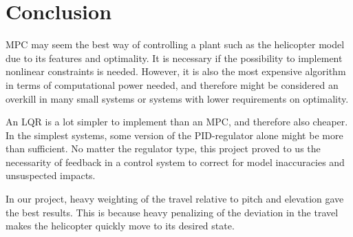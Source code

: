 \section{Conclusion}\label{sec:conclusion}
MPC may seem the best way of controlling a plant such as the helicopter model due to its features and optimality. It is necessary if the possibility to implement nonlinear constraints is needed. However, it is also the most expensive algorithm in terms of computational power needed, and therefore might be considered an overkill in many small systems or systems with lower requirements on optimality.

An LQR is a lot simpler to implement than an MPC, and therefore also cheaper. In the simplest systems, some version of the PID-regulator alone might be more than sufficient. No matter the regulator type, this project proved to us the necessarity of feedback in a control system to correct for model inaccuracies and unsuspected impacts.

In our project, heavy weighting of the travel relative to pitch and elevation gave the best results. This is because heavy penalizing of the deviation in the travel makes the helicopter quickly move to its desired state.